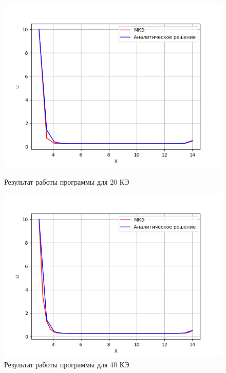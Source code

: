 \begin{figure}[!h]
    \centering
    \begin{minipage}{0.5\textwidth}
        \centering
        \includegraphics[width=1\textwidth]{labs/img/lin/20.png} %
        \caption{Результат работы программы для 20 КЭ}
        \label{l_20}
    \end{minipage}\hfill
    \begin{minipage}{0.5\textwidth}
        \centering
        \includegraphics[width=1\textwidth]{labs/img/lin/40.png} %
        \caption{Результат работы программы для 40 КЭ}
        \label{l_40}
    \end{minipage}
\end{figure}

